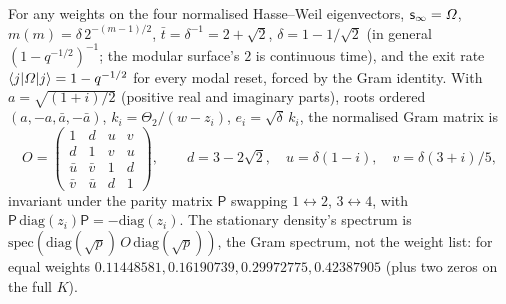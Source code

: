 \begin{proposition}
\label{prop:d2-modal-gram}
For any weights on the four normalised Hasse--Weil eigenvectors, $\mathsf s_\infty = \varOmega$, $m(m) = \delta\,2^{-(m-1)/2}$,
$\bar t = \delta^{-1} = 2+\sqrt2$, $\delta = 1-1/\sqrt2$ (in general $(1-q^{-1/2})^{-1}$; the modular surface's $2$ is
continuous time), and the exit rate $\langle j|\varOmega|j\rangle = 1-q^{-1/2}$ for every modal reset, forced by the Gram
identity. With $a = \sqrt{(1+i)/2}$ (positive real and imaginary parts), roots ordered $(a,-a,\bar a,-\bar a)$,
$k_i = \Theta_2/(w-z_i)$, $e_i = \sqrt\delta\,k_i$, the normalised Gram matrix is
\[
O = \begin{pmatrix}1&d&u&v\\ d&1&v&u\\ \bar u&\bar v&1&d\\ \bar v&\bar u&d&1\end{pmatrix},\qquad
d = 3-2\sqrt2,\quad u = \delta(1-i),\quad v = \delta(3+i)/5 ,
\]
invariant under the parity matrix $\mathsf P$ swapping $1\leftrightarrow2$, $3\leftrightarrow4$, with
$\mathsf P\,\mathrm{diag}(z_i)\mathsf P = -\mathrm{diag}(z_i)$. The stationary density's spectrum is
$\mathrm{spec}(\mathrm{diag}(\sqrt p)\,O\,\mathrm{diag}(\sqrt p))$, the Gram spectrum, not the weight list: for equal
weights $0.11448581, 0.16190739, 0.29972775, 0.42387905$ (plus two zeros on the full $K$).
\end{proposition}


